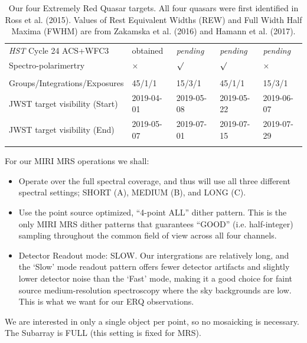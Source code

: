 \begin{table}[h]
\begin{center}
\begin{tabular}{||  l|l|l|l|l ||}
  {\it HST} Cycle 24  ACS+WFC3  %
                                       & obtained  &  {\it pending}   &{\it pending}  & {\it pending} \\
  Spectro-polarimertry       &   $\times$            &  $\surd$                &  $\surd$           & $\times$  \\
 &&&& \\
Groups/Integrations/Exposures      &  45/1/1              &   15/3/1  &   45/1/1         &   15/3/1         \\
JWST target visibility (Start) & 2019-04-01    & 2019-05-08    & 2019-05-22   & 2019-06-07  \\ 
JWST target visibility (End)  & 2019-05-07    & 2019-07-01     & 2019-07-15   & 2019-07-29   \\ 
 &&&& \\
\hline\hline
      \end{tabular}
\caption{
Our four Extremely Red Quasar targets. All four quasars were first
identified in Ross et al. (2015).  Values of Rest Equivalent Widths
(REW) and Full Width Half Maxima (FWHM) are from Zakamska et
al. (2016) and Hamann et al. (2017).
}
\label{tab:targets} 
  \end{center}
\end{table}

\smallskip \smallskip
\noindent
For our MIRI MRS operations we shall: 
\begin{itemize}
    \item Operate over the full spectral coverage, and thus will use all three different spectral settings;  
      SHORT (A), MEDIUM (B), and LONG (C). 
    \item Use the point source optimized, ``4-point ALL'' dither pattern.
      This is the only MIRI MRS dither patterns that guarantees ``GOOD''
      (i.e. half-integer) sampling throughout the common field of view
      across all four channels.
    \item{Detector Readout mode: SLOW. 
        Our intergrations are relatively long, and the `Slow' mode readout pattern offers fewer detector
        artifacts and slightly lower detector noise than the `Fast' mode,  
        making it a good choice for faint source medium-resolution
        spectroscopy where the sky backgrounds are low. 
        This is what we want for our ERQ observations.}
\end{itemize}
We are interested in only a single object per point, so no mosaicking is necessary.  
The Subarray is FULL (this setting is fixed for MRS). 

